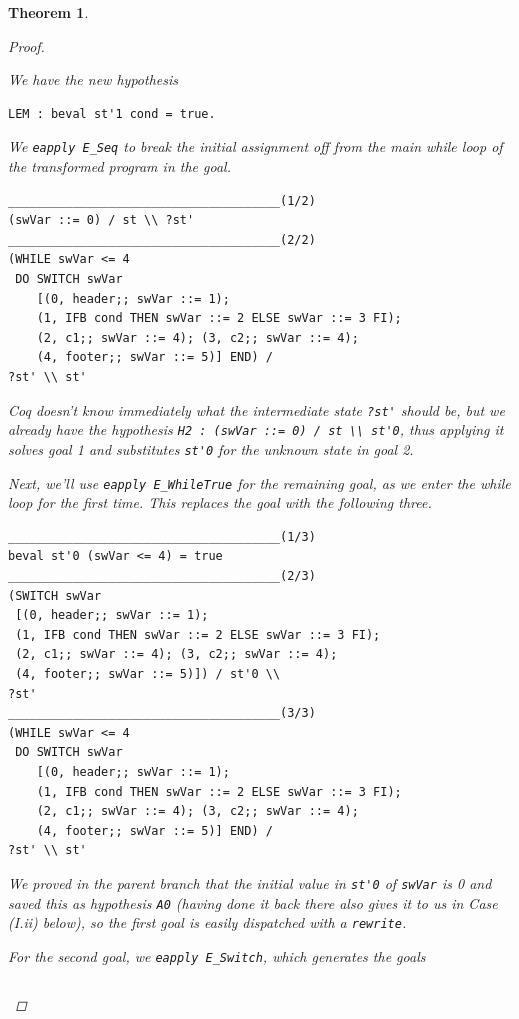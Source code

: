 \documentclass[12pt,notitlepage]{report}
\theoremstyle{plain}
\newtheorem{theo}{Theorem}[section]
\theoremstyle{definition}
\numberwithin{equation}{section}
\begin{document}
\begin{theo}
\begin{proof}
\begin{itemize}
\begin{itemize}
                \noindent We have the new hypothesis
                \begin{verbatim}
LEM : beval st'1 cond = true.\end{verbatim}
                \noindent We \verb$eapply E_Seq$ to break the initial assignment off from the main while loop of the transformed program in the goal.
\begin{verbatim}
______________________________________(1/2)
(swVar ::= 0) / st \\ ?st'
______________________________________(2/2)
(WHILE swVar <= 4
 DO SWITCH swVar
    [(0, header;; swVar ::= 1);
    (1, IFB cond THEN swVar ::= 2 ELSE swVar ::= 3 FI);
    (2, c1;; swVar ::= 4); (3, c2;; swVar ::= 4);
    (4, footer;; swVar ::= 5)] END) / 
?st' \\ st'\end{verbatim}
                Coq doesn't know immediately what the intermediate state \verb$?st'$ should be, but we already have the hypothesis \verb$H2 : (swVar ::= 0) / st \\ st'0$, thus applying it solves goal 1 and substitutes \verb$st'0$ for the unknown state in goal 2.
                \par Next, we'll use \verb$eapply E_WhileTrue$ for the remaining goal, as we enter the while loop for the first time.  This replaces the goal with the following three.
                \begin{verbatim}
______________________________________(1/3)
beval st'0 (swVar <= 4) = true
______________________________________(2/3)
(SWITCH swVar
 [(0, header;; swVar ::= 1);
 (1, IFB cond THEN swVar ::= 2 ELSE swVar ::= 3 FI);
 (2, c1;; swVar ::= 4); (3, c2;; swVar ::= 4);
 (4, footer;; swVar ::= 5)]) / st'0 \\ 
?st'
______________________________________(3/3)
(WHILE swVar <= 4
 DO SWITCH swVar
    [(0, header;; swVar ::= 1);
    (1, IFB cond THEN swVar ::= 2 ELSE swVar ::= 3 FI);
    (2, c1;; swVar ::= 4); (3, c2;; swVar ::= 4);
    (4, footer;; swVar ::= 5)] END) / 
?st' \\ st'\end{verbatim}
We proved in the parent branch that the initial value in \verb$st'0$ of \verb$swVar$ is 0 and saved this as hypothesis \verb$A0$ (having done it back there also gives it to us in Case (I.ii) below), so the first goal is easily dispatched with a \verb$rewrite$.
\par For the second goal, we \verb$eapply E_Switch$, which generates the goals
\begin{verbatim}

\end{verbatim}
\end{itemize}
\end{itemize}
\end{proof}
\end{theo}
\end{document}
